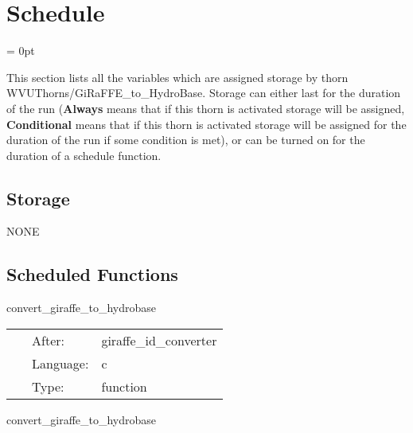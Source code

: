 
\section{Schedule} 


\parskip = 0pt


\noindent This section lists all the variables which are assigned storage by thorn WVUThorns/GiRaFFE\_to\_HydroBase.  Storage can either last for the duration of the run ({\bf Always} means that if this thorn is activated storage will be assigned, {\bf Conditional} means that if this thorn is activated storage will be assigned for the duration of the run if some condition is met), or can be turned on for the duration of a schedule function.


\subsection*{Storage}NONE
\subsection*{Scheduled Functions}
\vspace{5mm}


\hspace{5mm} convert\_giraffe\_to\_hydrobase 

\hspace{5mm}{\it convert giraffe-native variables to hydrobase } 


\hspace{5mm}

 \begin{tabular*}{160mm}{cll} 
~ & After:  & giraffe\_id\_converter \\ 
~ & Language:  & c \\ 
~ & Type:  & function \\ 
\end{tabular*} 


\vspace{5mm}


\hspace{5mm} convert\_giraffe\_to\_hydrobase 

\hspace{5mm}{\it convert giraffe-native variables to hydrobase } 


\hspace{5mm}

